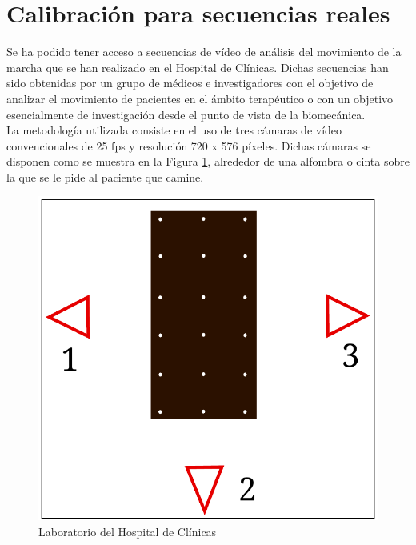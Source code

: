 
\section{Calibración para secuencias reales}

\label{seccion_calibracion_secuencias_reales}


Se ha podido tener acceso a secuencias de vídeo de análisis del movimiento de la marcha que se han realizado en el Hospital de Clínicas. Dichas secuencias han sido obtenidas por un grupo de médicos e investigadores con el objetivo de analizar el movimiento de pacientes en el ámbito terapéutico o con un objetivo esencialmente de investigación desde el punto de vista de la biomecánica.\\


La metodología utilizada consiste en el uso de tres cámaras de vídeo convencionales de 25 fps y resolución  720 x 576 píxeles. Dichas cámaras se disponen como se muestra en la Figura \ref{fig: lab_real}, alrededor de una alfombra o cinta sobre la que se le pide al paciente que camine.


\begin{figure}[ht!]
\centering
\includegraphics[scale=0.5]{img/calibracion/lab_real.pdf}
\vspace{-0.3cm}
\caption{Laboratorio del Hospital de Clínicas}
\label{fig: lab_real}
\end{figure}

